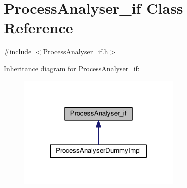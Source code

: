 \hypertarget{class_process_analyser__if}{}\section{Process\+Analyser\+\_\+if Class Reference}
\label{class_process_analyser__if}


{\ttfamily \#include $<$Process\+Analyser\+\_\+if.\+h$>$}



Inheritance diagram for Process\+Analyser\+\_\+if\+:
\nopagebreak
\begin{figure}[H]
\begin{center}
\leavevmode
\includegraphics[width=224pt]{class_process_analyser__if__inherit__graph}
\end{center}
\end{figure}
